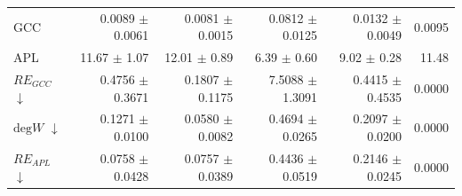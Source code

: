 \begin{table}[H]
\begin{tabular}{lrrrrr}
GCC                           & 0.0089 $\pm$ 0.0061 & 0.0081 $\pm$ 0.0015 & 0.0812 $\pm$ 0.0125 & 0.0132 $\pm$ 0.0049 & 0.0095 \\
APL                           & 11.67 $\pm$ 1.07 & 12.01 $\pm$ 0.89 & 6.39 $\pm$ 0.60 & 9.02 $\pm$ 0.28 & 11.48 \\
\midrule
$RE_{GCC}$ $\downarrow$       & 0.4756 $\pm$ 0.3671 & 0.1807 $\pm$ 0.1175 & 7.5088 $\pm$ 1.3091 & 0.4415 $\pm$ 0.4535 & 0.0000 \\
$\mathrm{deg}W$ $\downarrow$  & 0.1271 $\pm$ 0.0100 & 0.0580 $\pm$ 0.0082 & 0.4694 $\pm$ 0.0265 & 0.2097 $\pm$ 0.0200 & 0.0000 \\
$RE_{APL}$ $\downarrow$       & 0.0758 $\pm$ 0.0428 & 0.0757 $\pm$ 0.0389 & 0.4436 $\pm$ 0.0519 & 0.2146 $\pm$ 0.0245 & 0.0000 \\
\bottomrule
\end{tabular}
\end{table}
